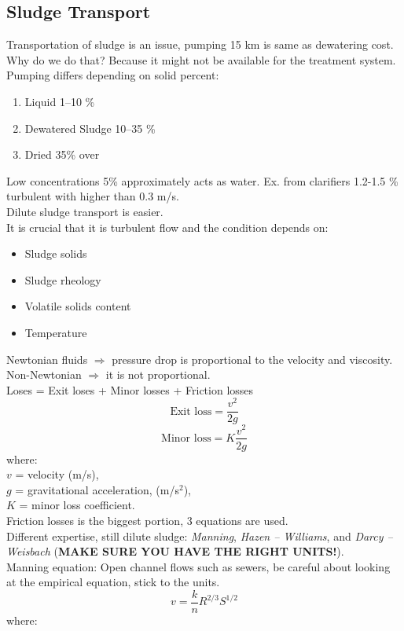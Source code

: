 \documentclass{article}
\numberwithin{equation}{section}
\begin{document}
\subsection{Sludge Transport}
Transportation of sludge is an issue, pumping 15 km is same as dewatering cost.\\
Why do we do that? Because it might not be available for the treatment system.\\
Pumping differs depending on solid percent:
\begin{enumerate}
    \item Liquid 1--10 \%
    \item Dewatered Sludge 10--35 \%
    \item Dried 35\% over
\end{enumerate}
Low concentrations 5\% approximately acts as water. Ex. from clarifiers 1.2-1.5 \% turbulent with higher than 0.3 m/s.\\
Dilute sludge transport is easier.\\
It is crucial that it is turbulent flow and the condition depends on:
\begin{itemize}
    \item Sludge solids
    \item Sludge rheology
    \item Volatile solids content
    \item Temperature
\end{itemize}
Newtonian fluids $\Rightarrow$ pressure drop is proportional to the velocity and viscosity.\\
Non-Newtonian $\Rightarrow$ it is not proportional.\\
Loses = Exit loses + Minor losses + Friction losses
\[
\text{Exit loss} = \frac{v^2}{2g}
\]
\[
\text{Minor loss} = K\frac{v^2}{2g}
\]
where:\\
$v$ = velocity (m/s),\\
$g$ = gravitational acceleration, (m/s$^2$),\\
$K$ = minor loss coefficient.\\
Friction losses is the biggest portion, 3 equations are used.\\
Different expertise, still dilute sludge: \emph{Manning}, \emph{Hazen -- Williams}, and \emph{Darcy -- Weisbach} (\textbf{MAKE SURE YOU HAVE THE RIGHT UNITS!}).\\
Manning equation: Open channel flows such as sewers, be careful about looking at the empirical equation, stick to the units.
\[
v = \frac{k}{n}R^{2/3}S^{1/2}
\]
where:\\
\end{document}
